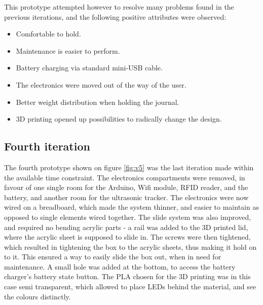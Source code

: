 This prototype attempted however to resolve many problems found in the previous iterations, and the following positive attributes were observed:

\begin{itemize} \itemsep0em
  \item Comfortable to hold.
  \item Maintenance is easier to perform.
  \item Battery charging via standard mini-USB cable.
  \item The electronics were moved out of the way of the user.
  \item Better weight distribution when holding the journal.
  \item 3D printing opened up possibilities to radically change the design.
\end{itemize}




\subsection{Fourth iteration}

The fourth prototype shown on figure \ref{fig:v5} was the last iteration made within the available time constraint. The electronics compartments were removed, in favour of one single room for the Arduino, Wifi module, RFID reader, and the battery, and another room for the ultrasonic tracker. The electronics were now wired on a breadboard, which made the system thinner, and easier to maintain as opposed to single elements wired together. The slide system was also improved, and required no bending acrylic parts - a rail was added to the 3D printed lid, where the acrylic sheet is supposed to slide in. The screws were then tightened, which resulted in tightening the box to the acrylic sheets, thus making it hold on to it. This ensured a way to easily slide the box out, when in need for maintenance. A small hole was added at the bottom, to access the battery charger's battery state button. The PLA chosen for the 3D printing was in this case semi transparent, which allowed to place LEDs behind the material, and see the colours distinctly.

